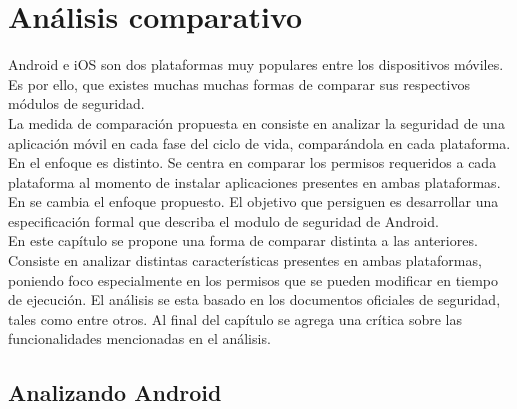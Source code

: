 \chapter{Análisis comparativo}
Android e iOS son dos plataformas muy populares entre los dispositivos móviles. Es por ello, que existes muchas  muchas formas de comparar sus respectivos módulos de seguridad.\\
La medida de comparación propuesta en \cite{YA2014} consiste en analizar la seguridad de una aplicación móvil en cada fase del ciclo de vida, comparándola en cada plataforma.\\
En \cite{HYGZD2013} el enfoque es distinto. Se centra en comparar los permisos requeridos a cada plataforma al momento de instalar aplicaciones presentes en ambas plataformas.\\
En \cite{Gor16, BCLR15, Rom14} se cambia el enfoque propuesto. El objetivo que persiguen es desarrollar una especificación formal que describa el modulo de seguridad de Android.\\
En este capítulo se propone una forma de comparar distinta a las anteriores. Consiste en analizar distintas características presentes en ambas plataformas, poniendo foco especialmente en los permisos que se pueden modificar en tiempo de ejecución. El análisis se esta basado en los documentos oficiales de seguridad, tales como \cite{aossec, asreview2015, asg} entre otros. Al final del capítulo se agrega una crítica sobre las funcionalidades mencionadas en el análisis.\\
\section{Analizando Android}
